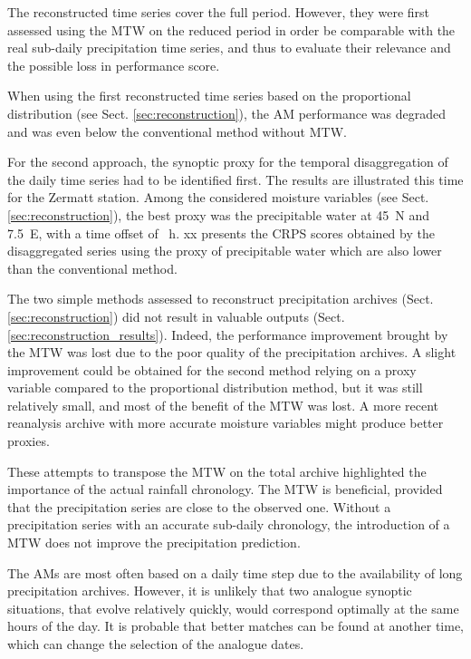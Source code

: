 \documentclass[hess, manuscript]{copernicus}
\begin{document}
	
	The reconstructed time series cover the full period. However, they were first assessed using the MTW on the reduced period in order be comparable with the real sub-daily precipitation time series, and thus to evaluate their relevance and the possible loss in performance score. 
	
	When using the first reconstructed time series based on the proportional distribution (see Sect. \ref{sec:reconstruction}), the AM performance was degraded and was even below the conventional method without MTW.
	
	For the second approach, the synoptic proxy for the temporal disaggregation of the daily time series had to be identified first. The results are illustrated this time for the Zermatt station. Among the considered moisture variables (see Sect. \ref{sec:reconstruction}), the best proxy was the precipitable water at 45\textdegree\ N and 7.5\textdegree\ E, with a time offset of ~h. xx presents the CRPS scores obtained by the disaggregated series using the proxy of precipitable water which are also lower than the conventional method.
	


	
	The two simple methods assessed to reconstruct precipitation archives (Sect. \ref{sec:reconstruction}) did not result in valuable outputs (Sect. \ref{sec:reconstruction_results}). Indeed, the performance improvement brought by the MTW was lost due to the poor quality of the precipitation archives. A slight improvement could be obtained for the second method relying on a proxy variable compared to the proportional distribution method, but it was still relatively small, and most of the benefit of the MTW was lost. A more recent reanalysis archive with more accurate moisture variables might produce better proxies.
	
	These attempts to transpose the MTW on the total archive highlighted the importance of the actual rainfall chronology. The MTW is beneficial, provided that the precipitation series are close to the observed one. Without a precipitation series with an accurate sub-daily chronology, the introduction of a MTW does not improve the precipitation prediction.
	
	
	
	\conclusions  %
	\label{sec:conclusions}
	
	The AMs are most often based on a daily time step due to the availability of long precipitation archives. However, it is unlikely that two analogue synoptic situations, that evolve relatively quickly, would correspond optimally at the same hours of the day. It is probable that better matches can be found at another time, which can change the selection of the analogue dates.
	
\end{document}
